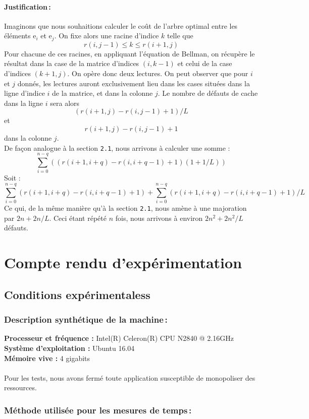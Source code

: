 \documentclass[a4paper, 10pt, french]{article}
\begin{document}
    \paragraph{Justification\,: }
    Imaginons que nous souhaitions calculer le coût de l'arbre optimal entre les éléments e$_i$ et e$_j$. On fixe alors une racine d'indice $k$ telle que $$ r(i, j-1) \leq k \leq r(i+1, j)$$ Pour chacune de ces racines, en appliquant l'équation de Bellman, on récupère le résultat dans la case de la matrice d'indices $(i, k-1)$ et celui de la case d'indices $(k+1, j)$. On opère donc deux lectures. On peut observer que pour $i$ et $j$ donnés, les lectures auront exclusivement lieu dans les cases situées dans la ligne d'indice $i$ de la matrice, et dans la colonne $j$. Le nombre de défauts de cache dans la ligne $i$ sera alors $$(r(i+1, j) - r(i, j-1) + 1)/L$$ et $$r(i+1, j) - r(i, j-1) + 1$$ dans la colonne $j$.\\ 
    De façon analogue à la section \texttt{2.1}, nous arrivons à calculer une somme :
$$ \sum_{i = 0}^{n - q} ((r(i+1, i+q) - r(i, i+q-1) + 1)(1+1/L))$$    
Soit : 
$$ \sum_{i = 0}^{n - q} (r(i+1, i+q) - r(i, i+q-1) + 1) + \sum_{i = 0}^{n - q} (r(i+1, i+q) - r(i, i+q-1) + 1)/L $$ 
Ce qui, de la même manière qu'à la section \texttt{2.1}, nous amène à une majoration par $2n + 2n/L$. Ceci étant répété $n$ fois, nous arrivons à environ $2n^2 + 2n^2/L$ défauts.
\section{Compte rendu d'expérimentation }
  \subsection{Conditions expérimentaless}
    \subsubsection{Description synthétique de la machine\,:} 
     
{\bf Processeur et fréquence :} Intel(R) Celeron(R) CPU  N2840  @ 2.16GHz\\
{\bf Système d'exploitation :} Ubuntu 16.04\\
{\bf Mémoire vive :} 4 gigabits\\ \\
Pour les tests, nous avons fermé toute application susceptible de monopoliser des ressources. 
      

    \subsubsection{Méthode utilisée pour les mesures de temps\,: } 
\end{document}
